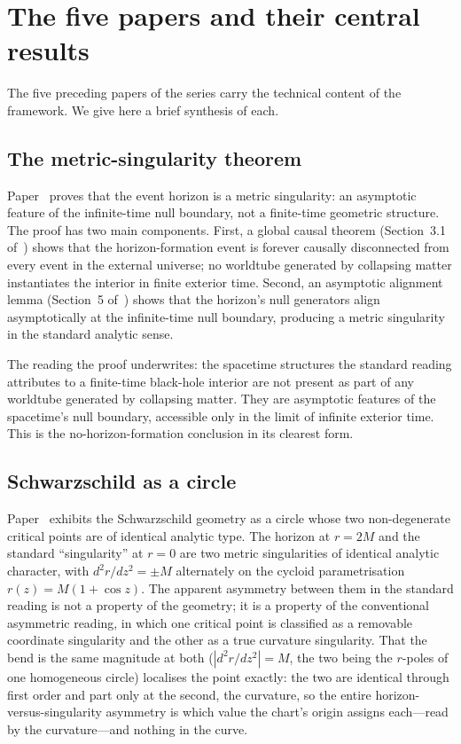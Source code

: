 \documentclass[11pt,a4paper]{article}
\theoremstyle{definition}
\begin{document}
\section{The five papers and their central results}\label{sec:five-papers}

The five preceding papers of the series carry the technical content of the framework. We give here a brief synthesis of each.

\subsection{The metric-singularity theorem}\label{sec:bh-causality}

Paper~\cite{JanzenBHcausality} proves that the event horizon is a metric singularity: an asymptotic feature of the infinite-time null boundary, not a finite-time geometric structure. The proof has two main components. First, a global causal theorem (Section~3.1 of~\cite{JanzenBHcausality}) shows that the horizon-formation event is forever causally disconnected from every event in the external universe; no worldtube generated by collapsing matter instantiates the interior in finite exterior time. Second, an asymptotic alignment lemma (Section~5 of~\cite{JanzenBHcausality}) shows that the horizon's null generators align asymptotically at the infinite-time null boundary, producing a metric singularity in the standard analytic sense.

The reading the proof underwrites: the spacetime structures the standard reading attributes to a finite-time black-hole interior are not present as part of any worldtube generated by collapsing matter. They are asymptotic features of the spacetime's null boundary, accessible only in the limit of infinite exterior time. This is the no-horizon-formation conclusion in its clearest form.

\subsection{Schwarzschild as a circle}\label{sec:circle}

Paper~\cite{JanzenCircle} exhibits the Schwarzschild geometry as a circle whose two non-degenerate critical points are of identical analytic type. The horizon at $r=2M$ and the standard ``singularity'' at $r=0$ are two metric singularities of identical analytic character, with $d^{2}r/dz^{2}=\pm M$ alternately on the cycloid parametrisation $r(z)=M(1+\cos z)$. The apparent asymmetry between them in the standard reading is not a property of the geometry; it is a property of the conventional asymmetric reading, in which one critical point is classified as a removable coordinate singularity and the other as a true curvature singularity. That the bend is the same magnitude at both ($|d^{2}r/dz^{2}|=M$, the two being the $r$-poles of one homogeneous circle) localises the point exactly: the two are identical through first order and part only at the second, the curvature, so the entire horizon-versus-singularity asymmetry is which value the chart's origin assigns each---read by the curvature---and nothing in the curve.
\end{document}
